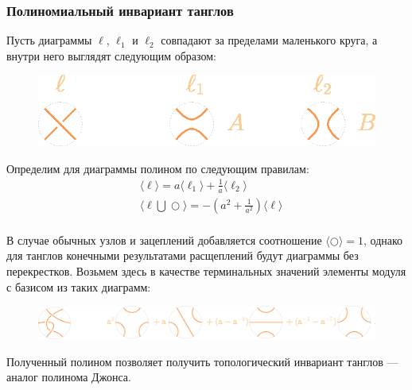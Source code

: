 \documentclass[dvips, intlimits, 9pt, unicode, notheorems, color=usenames,dvipsnames]{beamer}
\theoremstyle{plain}
\theoremstyle{definition}
\begin{document}
	\begin{frame}
		\frametitle{Полиномиальный инвариант танглов}

		Пусть диаграммы $\ell$, $\ell_1$ и $\ell_2$ совпадают за пределами маленького круга, а внутри него выглядят следующим образом: 
		\begin{figure}[ht]
			\centering
			\includegraphics[scale = 0.6]{c/kauffman-skein-definition.eps}
		\end{figure}

		Определим для диаграммы полином по следующим правилам:
		$$
		\begin{aligned}
			& \langle \ell \rangle = a\langle \ell_1 \rangle + \frac{1}{a} \langle {\ell_2} \rangle \\
			& \langle {\ell{\textstyle{}\bigcup{}}\bigcirc} \rangle = -(a^2 + \frac{1}{a^2}) \langle \ell \rangle \\
		\end{aligned}
		$$

		В случае обычных узлов и зацеплений добавляется соотношение $\langle \bigcirc \rangle = 1$, однако для танглов конечными результатами
		расщеплений будут диаграммы без перекрестков. Возьмем здесь в качестве терминальных значений элементы модуля с базисом из таких диаграмм:

		\begin{figure}[ht]
			\centering
			\includegraphics[scale = 0.5]{c/tangle-kauffman-example.eps}
		\end{figure}

		Полученный полином позволяет получить топологический инвариант танглов --- аналог полинома Джонса.
	\end{frame}
\end{document}
